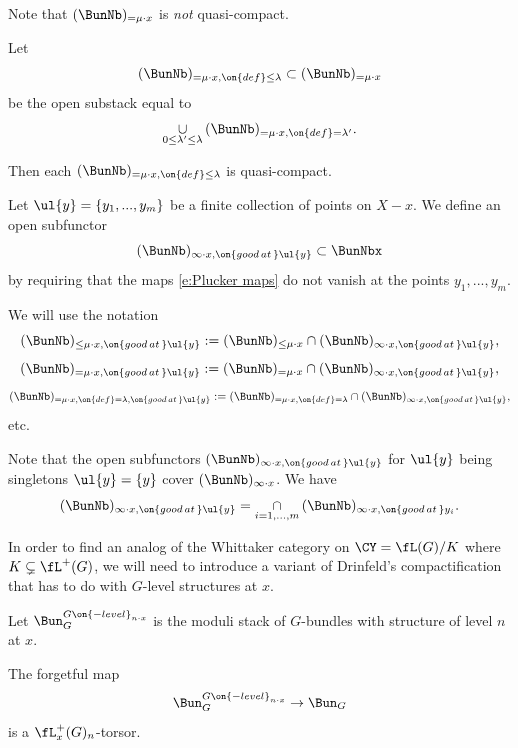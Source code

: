 \documentclass[9pt]{amsart}
\theoremstyle{definition}
\theoremstyle{remark}
\numberwithin{equation}{section}
\begin{document}
Note that $(\BunNb)_{=\mu\cdot x}$ is \emph{not} quasi-compact. 

\medskip

Let 
$$(\BunNb)_{=\mu\cdot x,\on{def}\leq \lambda}\subset (\BunNb)_{=\mu\cdot x}$$
be the open substack equal to 
$$\underset{0\leq \lambda'\leq \lambda}\cup\, (\BunNb)_{=\mu\cdot x,\on{def}=\lambda'}.$$

\medskip

Then each $(\BunNb)_{=\mu\cdot x,\on{def}\leq \lambda}$ is quasi-compact. 

\sssec{}

Let $\ul{y}=\{y_1,...,y_m\}$ be a finite collection of points on $X-x$. We define an open subfunctor
$$(\BunNb)_{\infty\cdot x,\on{good\,at\,}\ul{y}}\subset \BunNbx$$
by requiring that the maps  \eqref{e:Plucker maps} do not vanish at the points $y_1,...,y_m$.

\medskip

We will use the notation
$$(\BunNb)_{\leq \mu\cdot x,\on{good\,at\,}\ul{y}}:=(\BunNb)_{\leq\mu\cdot x}\cap 
(\BunNb)_{\infty\cdot x,\on{good\,at\,}\ul{y}},$$
$$(\BunNb)_{=\mu\cdot x,\on{good\,at\,}\ul{y}}:=(\BunNb)_{=\mu\cdot x}\cap 
(\BunNb)_{\infty\cdot x,\on{good\,at\,}\ul{y}},$$
$$(\BunNb)_{=\mu\cdot x,\on{def}=\lambda,\on{good\,at\,}\ul{y}}:=
(\BunNb)_{=\mu\cdot x,\on{def}=\lambda} \cap 
(\BunNb)_{\infty\cdot x,\on{good\,at\,}\ul{y}},$$
etc. 

\medskip

Note that the open subfunctors $(\BunNb)_{\infty\cdot x,\on{good\,at\,}\ul{y}}$ for $\ul{y}$ being singletons $\ul{y}=\{y\}$
cover $(\BunNb)_{\infty\cdot x}$.  We have
$$(\BunNb)_{\infty\cdot x,\on{good\,at\,}\ul{y}}=\underset{i=1,...,m}\cap\, (\BunNb)_{\infty\cdot x,\on{good\,at\,}y_i}.$$


In order to find an analog of the Whittaker category on $\CY=\fL(G)/K$ where $K\subsetneq \fL^+(G)$, we will
need to introduce a variant of Drinfeld's compactification that has to do with $G$-level structures at $x$. 

\sssec{}

Let $\Bun_G^{G\on{-level}_{n\cdot x}}$ is the moduli stack of $G$-bundles with structure of level $n$ at $x$.

\medskip

The forgetful map
$$\Bun_G^{G\on{-level}_{n\cdot x}}\to \Bun_G$$
is a $\fL^+_x(G)_n$-torsor. 

\sssec{}
\end{document}
